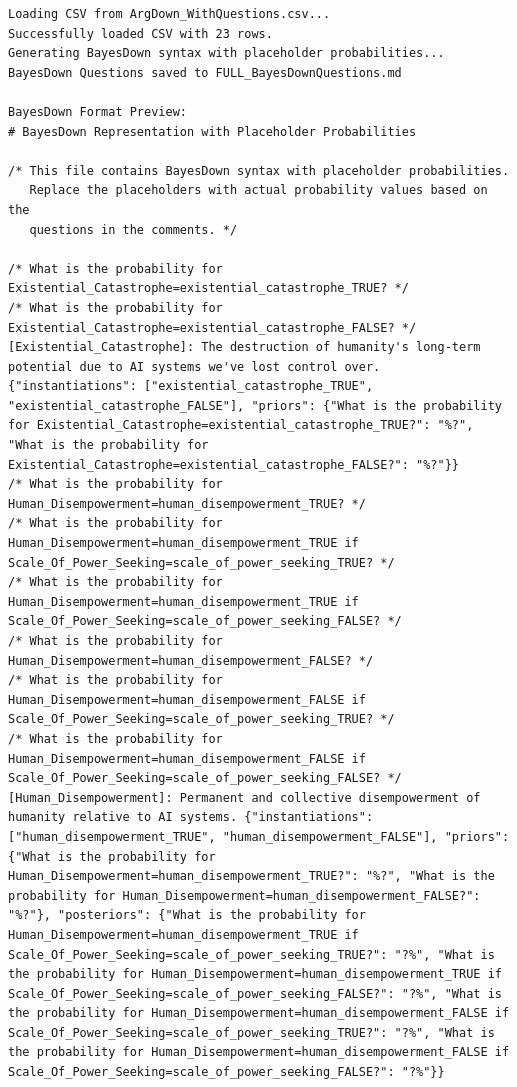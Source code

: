 \documentclass[
  11pt,
  letterpaper,
]{book}
\begin{document}
\begin{verbatim}
Loading CSV from ArgDown_WithQuestions.csv...
Successfully loaded CSV with 23 rows.
Generating BayesDown syntax with placeholder probabilities...
BayesDown Questions saved to FULL_BayesDownQuestions.md

BayesDown Format Preview:
# BayesDown Representation with Placeholder Probabilities

/* This file contains BayesDown syntax with placeholder probabilities.
   Replace the placeholders with actual probability values based on the 
   questions in the comments. */

/* What is the probability for Existential_Catastrophe=existential_catastrophe_TRUE? */
/* What is the probability for Existential_Catastrophe=existential_catastrophe_FALSE? */
[Existential_Catastrophe]: The destruction of humanity's long-term potential due to AI systems we've lost control over. {"instantiations": ["existential_catastrophe_TRUE", "existential_catastrophe_FALSE"], "priors": {"What is the probability for Existential_Catastrophe=existential_catastrophe_TRUE?": "%?", "What is the probability for Existential_Catastrophe=existential_catastrophe_FALSE?": "%?"}}
/* What is the probability for Human_Disempowerment=human_disempowerment_TRUE? */
/* What is the probability for Human_Disempowerment=human_disempowerment_TRUE if Scale_Of_Power_Seeking=scale_of_power_seeking_TRUE? */
/* What is the probability for Human_Disempowerment=human_disempowerment_TRUE if Scale_Of_Power_Seeking=scale_of_power_seeking_FALSE? */
/* What is the probability for Human_Disempowerment=human_disempowerment_FALSE? */
/* What is the probability for Human_Disempowerment=human_disempowerment_FALSE if Scale_Of_Power_Seeking=scale_of_power_seeking_TRUE? */
/* What is the probability for Human_Disempowerment=human_disempowerment_FALSE if Scale_Of_Power_Seeking=scale_of_power_seeking_FALSE? */
[Human_Disempowerment]: Permanent and collective disempowerment of humanity relative to AI systems. {"instantiations": ["human_disempowerment_TRUE", "human_disempowerment_FALSE"], "priors": {"What is the probability for Human_Disempowerment=human_disempowerment_TRUE?": "%?", "What is the probability for Human_Disempowerment=human_disempowerment_FALSE?": "%?"}, "posteriors": {"What is the probability for Human_Disempowerment=human_disempowerment_TRUE if Scale_Of_Power_Seeking=scale_of_power_seeking_TRUE?": "?%", "What is the probability for Human_Disempowerment=human_disempowerment_TRUE if Scale_Of_Power_Seeking=scale_of_power_seeking_FALSE?": "?%", "What is the probability for Human_Disempowerment=human_disempowerment_FALSE if Scale_Of_Power_Seeking=scale_of_power_seeking_TRUE?": "?%", "What is the probability for Human_Disempowerment=human_disempowerment_FALSE if Scale_Of_Power_Seeking=scale_of_power_seeking_FALSE?": "?%"}}

\end{verbatim}
\end{document}
